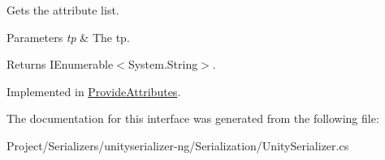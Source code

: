 Gets the attribute list. 


\begin{DoxyParams}{Parameters}
{\em tp} & The tp.\\
\hline
\end{DoxyParams}
\begin{DoxyReturn}{Returns}
I\+Enumerable$<$System.\+String$>$.
\end{DoxyReturn}


Implemented in \hyperlink{class_provide_attributes_aa43c5b30e202787ad574923f414c7eb3}{Provide\+Attributes}.



The documentation for this interface was generated from the following file\+:\begin{DoxyCompactItemize}
\item 
Project/\+Serializers/unityserializer-\/ng/\+Serialization/Unity\+Serializer.\+cs\end{DoxyCompactItemize}
